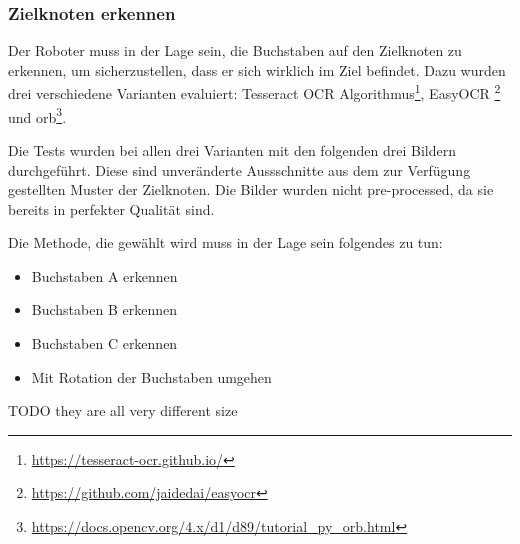 \subsubsection{Zielknoten erkennen}

Der Roboter muss in der Lage sein, die Buchstaben auf den Zielknoten zu erkennen, um sicherzustellen, dass er sich wirklich im Ziel befindet. Dazu wurden drei verschiedene Varianten evaluiert: Tesseract OCR Algorithmus\footnote{\url{https://tesseract-ocr.github.io/}}, EasyOCR \footnote{\url{https://github.com/jaidedai/easyocr}} und \acrfull{orb}\footnote{\url{https://docs.opencv.org/4.x/d1/d89/tutorial_py_orb.html}}.

Die Tests wurden bei allen drei Varianten mit den folgenden drei Bildern durchgeführt. Diese sind unveränderte Aussschnitte aus dem zur Verfügung gestellten Muster der Zielknoten. Die Bilder wurden nicht pre-processed, da sie bereits in perfekter Qualität sind.

Die Methode, die gewählt wird muss in der Lage sein folgendes zu tun:

\begin{itemize}
    \item Buchstaben A erkennen
    \item Buchstaben B erkennen
    \item Buchstaben C erkennen
    \item Mit Rotation der Buchstaben umgehen
\end{itemize}

TODO they are all very different size

